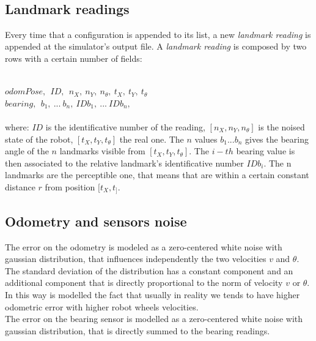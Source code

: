 \\
\subsection{Landmark readings}
Every time that a configuration is appended to its list, a new \textit{landmark reading} is appended at the simulator's output file.
A \textit{landmark reading} is composed by two rows with a certain number of fields:\\\

$
odomPose, ~~ ID, ~~ n_X, ~ n_Y, ~  n_{\theta}, ~  t_X, ~  t_Y, ~ t_{\theta}
$\\

$
bearing, ~~ b_1, ~ ... ~ b_n, ~ IDb_1, ~ ... ~ IDb_n, 
$\\ \\
where:
\textit{$ID$} is the identificative number of the reading, $[n_X, n_Y, n_{\theta}]$ is the noised state of the robot, $[t_X, t_Y, t_{\theta}]$ the real one.
The $n$ values $ b_1 ... b_n$ gives the bearing angle of the $n$ landmarks visible from $[t_X, t_Y, t_{\theta}]$. The $i-th$ bearing value is then associated to 
the relative landmark's identificative number $IDb_i$.
The n landmarks are the perceptible one, that means that are within a certain constant distance $r$ from position $[t_X, t_]$.


\subsection{Odometry and sensors noise}
The error on the odometry is modeled as a zero-centered white noise with gaussian distribution, that influences independently the two velocities $v$ and $\theta$.
The standard deviation of the distribution has a constant component and an additional component that is directly proportional to the norm of velocity $v$ or $\theta$.
In this way is modelled the fact that usually in reality we tends to have higher odometric error with higher robot wheels velocities.
\\
The error on the bearing sensor is modelled as a zero-centered white noise with gaussian distribution, that is directly summed to the bearing readings.\\